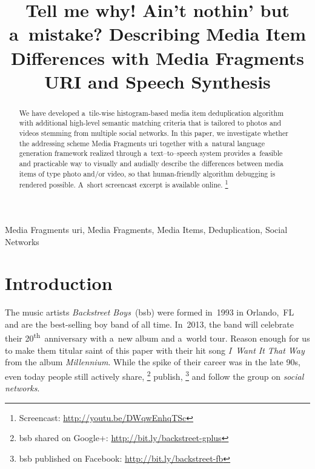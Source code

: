\documentclass{article}
\begin{document}
\sloppy

\newcommand{\ts}{\textsuperscript}

\title{Tell me why! Ain't nothin' but a~mistake? Describing Media Item Differences with Media Fragments URI and Speech Synthesis}
%
\address{}

\maketitle

%
\begin{abstract}
We have developed a~tile-wise histogram-based
media item deduplication algorithm
with additional high-level semantic matching criteria
that is tailored to photos and videos stemming from multiple social networks.
In this paper, we investigate whether the addressing scheme
Media Fragments {\sc uri} together with a~natural language generation framework realized through a~text--to--speech system
provides a~feasible and practicable way
to visually and audially describe the differences
between media items of type photo and/or video,
so that human-friendly algorithm debugging is rendered possible.
A~short screencast excerpt is available online.%
\footnote{Screencast: \url{http://youtu.be/DWqwEnhqTSc}}
\end{abstract}
%
\begin{keywords}
Media Fragments {\sc uri}, Media Fragments, Media Items, Deduplication, Social Networks
\end{keywords}
%
\section{Introduction}
\label{sec:introduction}

The music artists \emph{Backstreet Boys}~({\sc bsb})
were formed in~1993 in Orlando,~FL and
are the best-selling boy band of all time.
In~2013, the band will celebrate their 20\ts{th}~anniversary
with a~new album and a~world tour.
Reason enough for us to make them titular saint of this paper
with their hit song \emph{I~Want It That Way}
from the album \emph{Millennium}.
While the spike of their career was in the late 90s,
even today people still actively share,%
\footnote{{\sc bsb} shared on Google+: \url{http://bit.ly/backstreet-gplus}}
publish,%
\footnote{{\sc bsb} published on Facebook: \url{http://bit.ly/backstreet-fb}}
and follow the group on \emph{social networks}.
\end{document}
